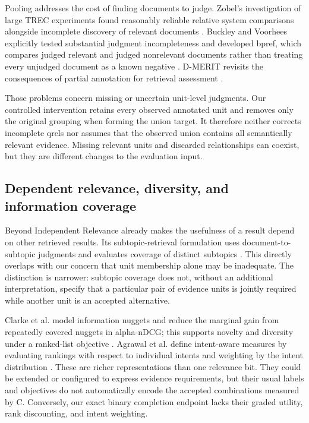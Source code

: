 \documentclass[twoside,a4paper,11pt]{article}
\begin{document}
Pooling addresses the cost of finding documents to judge. Zobel's investigation of large TREC experiments found reasonably reliable relative system comparisons alongside incomplete discovery of relevant documents \citep{zobel1998}. Buckley and Voorhees explicitly tested substantial judgment incompleteness and developed bpref, which compares judged relevant and judged nonrelevant documents rather than treating every unjudged document as a known negative \citep{buckley2004}. D-MERIT revisits the consequences of partial annotation for retrieval assessment \citep{dmerit}.

Those problems concern missing or uncertain unit-level judgments. Our controlled intervention retains every observed annotated unit and removes only the original grouping when forming the union target. It therefore neither corrects incomplete qrels nor assumes that the observed union contains all semantically relevant evidence. Missing relevant units and discarded relationships can coexist, but they are different changes to the evaluation input.


\subsection{Dependent relevance, diversity, and information coverage}
Beyond Independent Relevance already makes the usefulness of a result depend on other retrieved results. Its subtopic-retrieval formulation uses document-to-subtopic judgments and evaluates coverage of distinct subtopics \citep{zhai2003}. This directly overlaps with our concern that unit membership alone may be inadequate. The distinction is narrower: subtopic coverage does not, without an additional interpretation, specify that a particular pair of evidence units is jointly required while another unit is an accepted alternative.

Clarke et al. model information nuggets and reduce the marginal gain from repeatedly covered nuggets in alpha-nDCG; this supports novelty and diversity under a ranked-list objective \citep{clarke2008}. Agrawal et al. define intent-aware measures by evaluating rankings with respect to individual intents and weighting by the intent distribution \citep{agrawal2009}. These are richer representations than one relevance bit. They could be extended or configured to express evidence requirements, but their usual labels and objectives do not automatically encode the accepted combinations measured by C. Conversely, our exact binary completion endpoint lacks their graded utility, rank discounting, and intent weighting.
\end{document}
